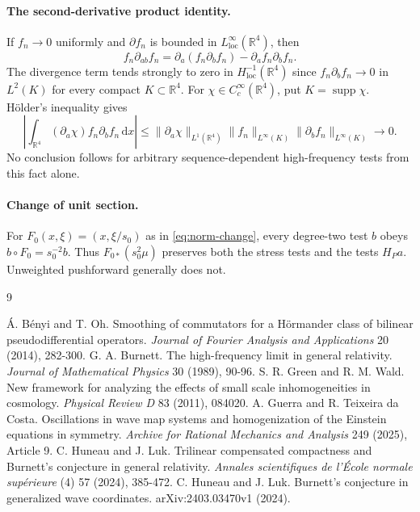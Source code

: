 \documentclass[11pt,a4paper]{article}
\numberwithin{equation}{section}
\newcommand{\supp}{\operatorname{supp}}
\newcommand{\loc}{\mathrm{loc}}
\newcommand{\dd}{\mathrm d}
\newcommand{\R}{\mathbb R}
\theoremstyle{definition}
\begin{document}
\paragraph{The second-derivative product identity.}
If $f_n\to0$ uniformly and $\partial f_n$ is bounded in $L^\infty_{\loc}(\R^4)$, then
\begin{equation*}
f_n\partial_{ab}f_n=\partial_a(f_n\partial_bf_n)-\partial_af_n\partial_bf_n.
\end{equation*}
The divergence term tends strongly to zero in $H^{-1}_{\loc}(\R^4)$ since $f_n\partial_bf_n\to0$ in $L^2(K)$ for every compact $K\subset\R^4$. For $\chi\in C_c^\infty(\R^4)$, put $K=\supp\chi$.
H\"older's inequality gives
\begin{equation*}
\left|\int_{\R^4}(\partial_a\chi)f_n\partial_bf_n\,\dd x\right|
\leq\|\partial_a\chi\|_{L^1(\R^4)}
 \|f_n\|_{L^\infty(K)}\|\partial_bf_n\|_{L^\infty(K)}\longrightarrow0.
\end{equation*}
No conclusion follows for arbitrary sequence-dependent high-frequency tests from this fact alone.

\paragraph{Change of unit section.}
For $F_0(x,\xi)=(x,\xi/s_0)$ as in \eqref{eq:norm-change}, every degree-two test $b$ obeys $b\circ F_0=s_0^{-2}b$. Thus $F_{0*}(s_0^2\mu)$ preserves both the stress tests and the tests $H_Pa$. Unweighted pushforward generally does not.

\clearpage
{}
{}
\begin{thebibliography}{9}\raggedright
{} \'A. B\'enyi and T. Oh. Smoothing of commutators for a H\"ormander class of bilinear pseudodifferential operators. \emph{Journal of Fourier Analysis and Applications} 20 (2014), 282-300.
 G. A. Burnett. The high-frequency limit in general relativity. \emph{Journal of Mathematical Physics} 30 (1989), 90-96.
 S. R. Green and R. M. Wald. New framework for analyzing the effects of small scale inhomogeneities in cosmology. \emph{Physical Review D} 83 (2011), 084020.
 A. Guerra and R. Teixeira da Costa. Oscillations in wave map systems and homogenization of the Einstein equations in symmetry. \emph{Archive for Rational Mechanics and Analysis} 249 (2025), Article 9.
 C. Huneau and J. Luk. Trilinear compensated compactness and Burnett's conjecture in general relativity. \emph{Annales scientifiques de l'\'Ecole normale sup\'erieure} (4) 57 (2024), 385-472.
 C. Huneau and J. Luk. Burnett's conjecture in generalized wave coordinates. arXiv:2403.03470v1 (2024).
\end{thebibliography}
\end{document}
